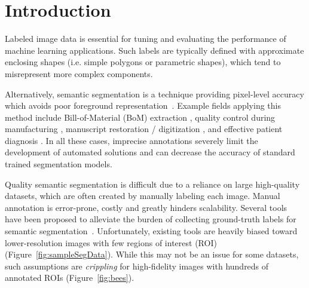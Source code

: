\section{Introduction}
Labeled image data is essential for tuning and evaluating the performance of machine learning applications.
Such labels are typically defined with approximate enclosing shapes (i.e. simple polygons or parametric shapes), which tend to misrepresent more complex components.

Alternatively, semantic segmentation is a technique providing pixel-level accuracy which avoids poor foreground representation~\cite{chengSurveyAnalysisAutomatic2018}.
Example fields applying this method include Bill-of-Material (BoM) extraction \cite{azhaganReviewAutomaticBill2019}, quality control during manufacturing \cite{fergusonDetectionSegmentationManufacturing2018,anagnostopoulosComputerVisionApproach2001,anagnostopoulosHighPerformanceComputing2002}, manuscript restoration / digitization \cite{gatosSegmentationfreeRecognitionTechnique2004,kesimanNewSchemeText2016,jainTextSegmentationUsing1992,taxtSegmentationDocumentImages1989,fujisawaSegmentationMethodsCharacter1992}, and effective patient diagnosis \cite{seifertSemanticAnnotationMedical2010,rajchlDeepCutObjectSegmentation2017,yushkevichUserguided3DActive2006,iakovidisRatsnakeVersatileImage2014}.
In all these cases, imprecise annotations severely limit the development of automated solutions and can decrease the accuracy of standard trained segmentation models.

Quality semantic segmentation is difficult due to a reliance on large high-quality datasets, which are often created by manually labeling each image.
Manual annotation is error-prone, costly and greatly hinders scalability.
Several tools have been proposed to alleviate the burden of collecting ground-truth labels for semantic segmentation~\cite{BestImageAnnotation}.
Unfortunately, existing tools are heavily biased toward lower-resolution images with few regions of interest (ROI) (Figure~\ref{fig:sampleSegData}).
While this may not be an issue for some datasets, such assumptions are \textit{crippling} for high-fidelity images with hundreds of annotated ROIs (Figure~\ref{fig:bees}).


